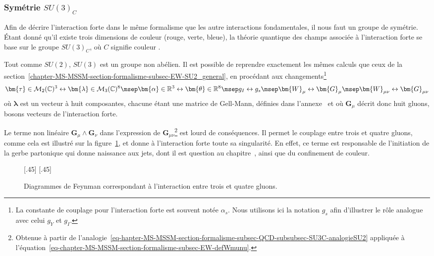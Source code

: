 \subsubsection{Symétrie $SU(3)_C$}\label{chapter-MS-MSSM-section-formalisme-subsec-QCD-subsubsec-SU3C}
Afin de décrire l'interaction forte dans le même formalisme que les autre interactions fondamentales, il nous faut un groupe de symétrie. Étant donné qu'il existe trois dimensions de couleur (rouge, verte, bleue), la théorie quantique des champs associée à l'interaction forte se base sur le groupe $SU(3)_C$, où $C$ signifie \og couleur \fg.
\par Tout comme $SU(2)$, $SU(3)$ est un groupe non abélien. Il est possible de reprendre exactement les mêmes calculs que ceux de la section~\ref{chapter-MS-MSSM-section-formalisme-subsec-EW-SU2_general}, en procédant aux changements\footnote{La constante de couplage pour l'interaction forte est souvent notée $\alpha_s$. Nous utilisons ici la notation $g_s$ afin d'illustrer le rôle analogue avec celui $g_Y$ et $g_I$.}
\begin{equation}
\bm{\tau} \in \mathcal{M}_2(\mathbb{C})^3 \leftrightarrow \bm{\lambda} \in \mathcal{M}_3(\mathbb{C})^8
\msep
\bm{\alpha}\in\mathbb{R}^3 \leftrightarrow \bm{\theta}\in\mathbb{R}^8
\msep
g_I \leftrightarrow g_s
\msep
\bm{W}_\mu \leftrightarrow \bm{G}_\mu
\msep
\bm{W}_{\mu\nu} \leftrightarrow \bm{G}_{\mu\nu}
\label{eq-hapter-MS-MSSM-section-formalisme-subsec-QCD-subsubsec-SU3C-analogieSU2}
\end{equation}
où $\bm{\lambda}$ est un vecteur à huit composantes, chacune étant une matrice de Gell-Mann, définies dans l'annexe~ et où $\bm{G}_\mu$ décrit donc huit gluons, bosons vecteurs de l'interaction forte.
\par Le terme non linéaire $\bm{G}_\mu\wedge\bm{G}_\nu$ dans l'expression de $\bm{G}_{\mu\nu}$\footnote{Obtenue à partir de l'analogie~\eqref{eq-hapter-MS-MSSM-section-formalisme-subsec-QCD-subsubsec-SU3C-analogieSU2} appliquée à l'équation~\eqref{eq-chapter-MS-MSSM-section-formalisme-subsec-EW-defWmunu}.} est lourd de conséquences.
Il permet le couplage entre trois et quatre gluons, comme cela est illustré sur la figure~\ref{fig-fgraph-QCD_3_et_4_gluons}, et donne à l'interaction forte toute sa singularité. En effet, ce terme est responsable de l'initiation de la gerbe partonique qui donne naissance aux jets, dont il est question au chapitre~, ainsi que du confinement de couleur.
\begin{figure}[h]
\centering
\vspace{\baselineskip}
\subcaptionbox{\label{subfig-fgraph-ggg}}[.45\textwidth]
{\vspace{\baselineskip}}
\hfill
\subcaptionbox{\label{subfig-fgraph-gggg}}[.45\textwidth]
{\vspace{\baselineskip}}

\caption{Diagrammes de Feynman correspondant à l'interaction entre trois et quatre gluons.}
\label{fig-fgraph-QCD_3_et_4_gluons}
\end{figure}

